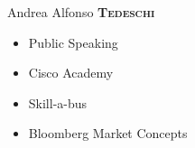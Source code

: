 \begin{minipage}[t]{0.33\textwidth} %
\colorbox{cvblue}{\begin{minipage}[t][5mm][t]{\textwidth}\null\hfill\null\end{minipage}}

\vspace{-.2ex} 						%
\colorbox{cvblue!90}{\color{white}  %
	\textwidth\relax		%
	\begin{minipage}[t][293mm][t]{0.82\textwidth}
	\raggedright
	\vspace*{2.5ex}

	\Large Andrea Alfonso \textbf{\textsc{Tedeschi}} \normalsize 

	\begin{center}
	\end{center}

	\vspace*{0.0ex} %

	

	

	


	

	\begin{itemize}
		\item Public Speaking
		\item Cisco Academy
		\item Skill-a-bus
		\item Bloomberg Market Concepts
	\end{itemize}

	\end{minipage}%
	\textwidth\relax
} 									%
\end{minipage} 						%